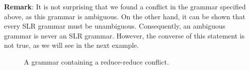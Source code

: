 \noindent
\textbf{Remark}: It is not surprising that we found a conflict in the grammar specified above, as this grammar
is ambiguous. On the other hand, it can be shown that every SLR grammar must be unambiguous. Consequently, an
ambiguous grammar is never an SLR grammar. However, the converse of this statement is not true, as we will see
in the next example. 
\eox


\begin{figure}[htbp]
  \begin{center}
  \vspace*{-0.3cm}

  \end{center}
  \caption{A grammar containing a reduce-reduce conflict.}
  \label{fig:reduce-reduce-conflict.grammar}
\end{figure}

